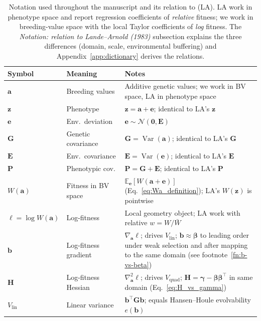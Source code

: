 \documentclass[9pt,twocolumn,twoside,lineno]{gsajnl}
\newcommand{\vect}[1]{\boldsymbol{#1}}
\newcommand{\mat}[1]{\mathbf{#1}}
\newcommand{\Vlin}{\ensuremath{V_{\text{lin}}}\xspace}
\newcommand{\Vquad}{\ensuremath{V_{\text{quad}}}\xspace}
\newcommand{\Var}{\ensuremath{\operatorname{Var}}\xspace}
\begin{document}
\begin{table}[H]
\centering
\caption{Notation used throughout the manuscript and its relation to \citet{LandeArnold1983} (LA). LA work in phenotype space and report regression coefficients of \emph{relative} fitness; we work in breeding-value space with the local Taylor coefficients of \emph{log} fitness. The \textit{Notation: relation to Lande--Arnold (1983)} subsection explains the three differences (domain, scale, environmental buffering) and Appendix~\ref{app:dictionary} derives the relations.}
\label{tab:notation}
\small
\begin{tabular}{@{}l p{1.9cm} p{4.0cm}@{}}
\toprule
Symbol & Meaning & Notes \\
\midrule
$\vect{a}$ & Breeding values & Additive genetic values; we work in BV space, LA in phenotype space \\
$\vect{z}$ & Phenotype & $\vect{z} = \vect{a} + \vect{e}$; identical to LA's $\vect{z}$ \\
$\vect{e}$ & Env.\ deviation & $\vect{e} \sim \mathcal{N}(\vect{0}, \mat{E})$ \\
$\mat{G}$ & Genetic covariance & $\mat{G} = \Var(\vect{a})$; identical to LA's $\mat{G}$ \\
$\mat{E}$ & Env.\ covariance & $\mat{E} = \Var(\vect{e})$; identical to LA's $\mat{E}$ \\
$\mat{P}$ & Phenotypic cov. & $\mat{P} = \mat{G} + \mat{E}$; identical to LA's $\mat{P}$ \\
$W(\vect{a})$ & Fitness in BV space & $\mathbb{E}_{\vect{e}}[W(\vect{a}+\vect{e})]$ (Eq.~\ref{eq:Wa_definition}); LA's $W(\vect{z})$ is pointwise \\
$\ell = \log W(\vect{a})$ & Log-fitness & Local geometry object; LA work with relative $w = W/\bar{W}$ \\
$\vect{b}$ & Log-fitness gradient & $\nabla_{\vect{a}} \ell$; drives $\Vlin$; $\vect{b}\approx\bm{\beta}$ to leading order under weak selection and after mapping to the same domain (see footnote~\ref{fn:b-vs-beta}) \\
$\mat{H}$ & Log-fitness Hessian & $\nabla^2_{\vect{a}} \ell$; drives $\Vquad$; $\mat{H} = \bm{\gamma}-\bm{\beta}\bm{\beta}^{\top}$ in same domain (Eq.~\ref{eq:H_vs_gamma}) \\
$\Vlin$ & Linear variance & $\vect{b}^\top \mat{G} \vect{b}$; equals Hansen--Houle evolvability $e(\vect{b})$ \\

\end{tabular}
\end{table}
\end{document}
